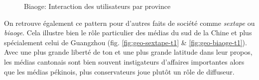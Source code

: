 \begin{figure}[H]
  \caption{
    Biaoge: Interaction des utilisateurs par province
  }
\end{figure}

On retrouve \'egalement ce pattern pour d{\textquoteright}autres faits de soci\'et\'e comme \textit{sextape} ou \textit{biaoge}. Cela illustre bien le r\^ole particulier des m\'edias du sud de la Chine et plus sp\'ecialement celui de Guangzhou (fig. \ref{fig:geo-sextape-t1} \& \ref{fig:geo-biaoge-t1}). Avec une plus grande libert\'e de ton et une plus grande latitude dans leur propos, les m\'edias cantonais sont bien souvent instigateurs d{\textquoteright}affaires importantes alors que les m\'edias p\'ekinois, plus conservateurs joue plut\^ot un r\^ole de diffuseur. 


